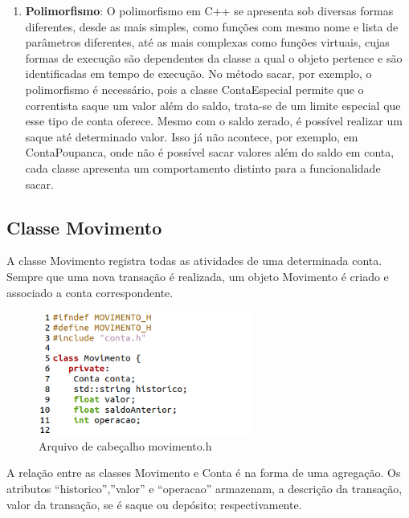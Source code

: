 \documentclass[conference]{IEEEtran}
\begin{document}
\begin{enumerate}
    \item \textbf{Polimorfismo}: O polimorfismo em C++ se apresenta sob diversas formas diferentes, desde as mais simples, como funções com mesmo nome e lista de parâmetros diferentes, até as mais complexas como funções virtuais, cujas formas de execução são dependentes da classe a qual o objeto pertence e são identificadas em tempo de execução.
    No método sacar, por exemplo, o polimorfismo é necessário, pois a classe ContaEspecial permite que o correntista saque um valor além do saldo, trata-se de um limite especial que esse tipo de conta oferece. Mesmo com o saldo zerado, é possível realizar um saque até determinado valor. Isso já não acontece, por exemplo, em ContaPoupanca, onde não é possível sacar valores além do saldo em conta, cada classe apresenta um comportamento distinto para a funcionalidade sacar.
    \end{enumerate}

    \subsection{Classe Movimento}
    A classe Movimento registra todas as atividades de uma determinada conta. Sempre que uma nova transação é realizada, um objeto Movimento é criado e associado a conta correspondente. 
    \begin{figure}[htbp]
        \centering
        \includegraphics[width=7cm]{../img/Movimento.png}
        \caption{Arquivo de cabeçalho movimento.h}
        \label{fig_movimento}
    \end{figure}

    A relação entre as classes Movimento e Conta é na forma de uma agregação. Os atributos “historico”,”valor” e “operacao” armazenam, a descrição da transação, valor da transação, se é saque ou depósito; respectivamente.
\end{document}
